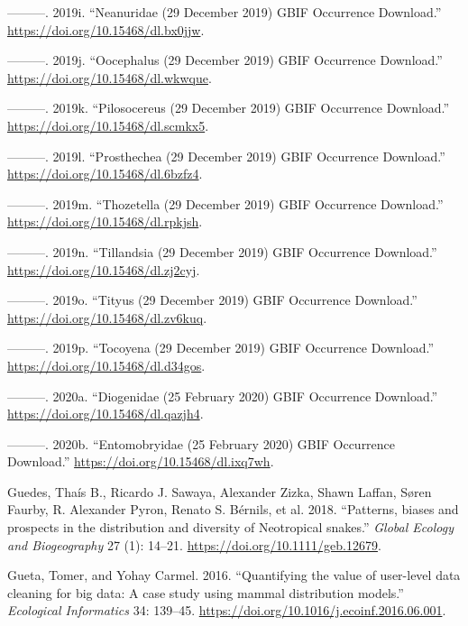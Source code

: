 \documentclass[fleqn,10pt,lineno]{wlpeerj} %
\begin{document}
\leavevmode\hypertarget{ref-GBIForg2019a}{}%
---------. 2019i. ``Neanuridae (29 December 2019) GBIF Occurrence Download.'' \url{https://doi.org/10.15468/dl.bx0jjw}.

\leavevmode\hypertarget{ref-GBIForg2019n}{}%
---------. 2019j. ``Oocephalus (29 December 2019) GBIF Occurrence Download.'' \url{https://doi.org/10.15468/dl.wkwque}.

\leavevmode\hypertarget{ref-GBIForg2019k}{}%
---------. 2019k. ``Pilosocereus (29 December 2019) GBIF Occurrence Download.'' \url{https://doi.org/10.15468/dl.scmkx5}.

\leavevmode\hypertarget{ref-GBIForg2019m}{}%
---------. 2019l. ``Prosthechea (29 December 2019) GBIF Occurrence Download.'' \url{https://doi.org/10.15468/dl.6bzfz4}.

\leavevmode\hypertarget{ref-GBIForg2019h}{}%
---------. 2019m. ``Thozetella (29 December 2019) GBIF Occurrence Download.'' \url{https://doi.org/10.15468/dl.rpkjsh}.

\leavevmode\hypertarget{ref-GBIForg2019o}{}%
---------. 2019n. ``Tillandsia (29 December 2019) GBIF Occurrence Download.'' \url{https://doi.org/10.15468/dl.zj2cyj}.

\leavevmode\hypertarget{ref-GBIForg2019b}{}%
---------. 2019o. ``Tityus (29 December 2019) GBIF Occurrence Download.'' \url{https://doi.org/10.15468/dl.zv6kuq}.

\leavevmode\hypertarget{ref-GBIForg2019l}{}%
---------. 2019p. ``Tocoyena (29 December 2019) GBIF Occurrence Download.'' \url{https://doi.org/10.15468/dl.d34gos}.

\leavevmode\hypertarget{ref-GBIForg2020}{}%
---------. 2020a. ``Diogenidae (25 February 2020) GBIF Occurrence Download.'' \url{https://doi.org/10.15468/dl.qazjh4}.

\leavevmode\hypertarget{ref-GBIForg2020a}{}%
---------. 2020b. ``Entomobryidae (25 February 2020) GBIF Occurrence Download.'' \url{https://doi.org/10.15468/dl.ixq7wh}.

\leavevmode\hypertarget{ref-Guedes2018}{}%
Guedes, Thaís B., Ricardo J. Sawaya, Alexander Zizka, Shawn Laffan, Søren Faurby, R. Alexander Pyron, Renato S. Bérnils, et al. 2018. ``Patterns, biases and prospects in the distribution and diversity of Neotropical snakes.'' \emph{Global Ecology and Biogeography} 27 (1): 14--21. \url{https://doi.org/10.1111/geb.12679}.

\leavevmode\hypertarget{ref-Gueta2016}{}%
Gueta, Tomer, and Yohay Carmel. 2016. ``Quantifying the value of user-level data cleaning for big data: A case study using mammal distribution models.'' \emph{Ecological Informatics} 34: 139--45. \url{https://doi.org/10.1016/j.ecoinf.2016.06.001}.
\end{document}
